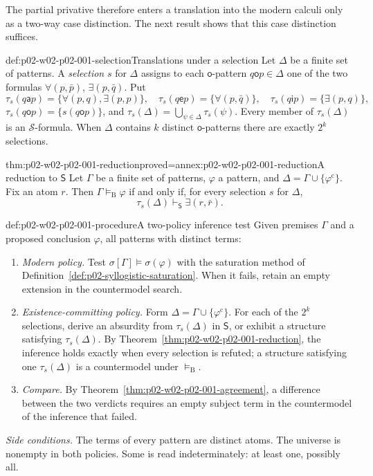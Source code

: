 The partial privative therefore enters a translation into the modern
calculi only as a two-way case distinction. The next result shows that
this case distinction suffices.

\begin{hbdefinition}{def:p02-w02-p02-001-selection}{Translations under a selection}
Let \(\Delta\) be a finite set of patterns. A \emph{selection} \(s\) for
\(\Delta\) assigns to each \(\mathsf o\)-pattern \(q\mathbin{\mathsf o}p\in\Delta\)
one of the two formulas \(\forall(p,\bar p)\), \(\exists(p,\bar q)\). Put
\[
 \tau_s(q\mathbin{\mathsf a}p)=\{\forall(p,q),\exists(p,p)\},\quad
 \tau_s(q\mathbin{\mathsf e}p)=\{\forall(p,\bar q)\},\quad
 \tau_s(q\mathbin{\mathsf i}p)=\{\exists(p,q)\},
\]
\(\tau_s(q\mathbin{\mathsf o}p)=\{s(q\mathbin{\mathsf o}p)\}\), and
\(\tau_s(\Delta)=\bigcup_{\psi\in\Delta}\tau_s(\psi)\). Every member of
\(\tau_s(\Delta)\) is an \(\mathcal S\)-formula. When \(\Delta\) contains \(k\) distinct
\(\mathsf o\)-patterns there are exactly \(2^k\) selections.
\end{hbdefinition}

\begin{hbtheorem}{thm:p02-w02-p02-001-reduction}{proved=annex:p02-w02-p02-001-reduction}{A reduction to \(\mathsf S\)}
Let \(\Gamma\) be a finite set of patterns, \(\varphi\) a pattern, and
\(\Delta=\Gamma\cup\{\varphi^{\mathrm c}\}\). Fix an atom \(r\). Then
\(\Gamma\models_{\mathrm B}\varphi\) if and only if, for every selection
\(s\) for \(\Delta\),
\[
 \tau_s(\Delta)\vdash_{\mathsf S}\exists(r,\bar r).
\]
\end{hbtheorem}

\begin{hbmethod}{def:p02-w02-p02-001-procedure}{A two-policy inference test}
Given premises \(\Gamma\) and a proposed conclusion \(\varphi\), all
patterns with distinct terms:
\begin{enumerate}
\item \emph{Modern policy.} Test
 \(\sigma[\Gamma]\models\sigma(\varphi)\) with the saturation method of
 Definition~\ref{def:p02-syllogistic-saturation}. When it fails, retain an
 empty extension in the countermodel search.
\item \emph{Existence-committing policy.} Form
 \(\Delta=\Gamma\cup\{\varphi^{\mathrm c}\}\). For each of the \(2^k\)
 selections, derive an absurdity from \(\tau_s(\Delta)\) in \(\mathsf S\),
 or exhibit a structure satisfying \(\tau_s(\Delta)\). By
 Theorem~\ref{thm:p02-w02-p02-001-reduction}, the inference holds exactly
 when every selection is refuted; a structure satisfying one
 \(\tau_s(\Delta)\) is a countermodel under \(\models_{\mathrm B}\).
\item \emph{Compare.} By Theorem~\ref{thm:p02-w02-p02-001-agreement}, a
 difference between the two verdicts requires an empty subject term in the
 countermodel of the inference that failed.
\end{enumerate}
\emph{Side conditions.} The terms of every pattern are distinct atoms.
The universe is nonempty in both policies. Some is read indeterminately:
at least one, possibly all.
\end{hbmethod}

